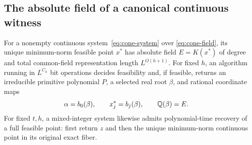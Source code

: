\subsection{The absolute field of a canonical continuous witness}
\label{app:cone-witness}

\begin{theorem}
\label{thm:cone-witness}
For a nonempty continuous system~\eqref{eq:cone-system} over
\eqref{eq:cone-field}, its unique minimum-norm feasible point $x^*$
has absolute field $E=K(x^*)$ of degree and total common-field
representation length $L^{O(h+1)}$. For fixed $h$, an algorithm running
in $L^{C_h}$ bit operations decides feasibility and, if feasible, returns
an irreducible primitive polynomial $P$, a selected real root $\beta$,
and rational coordinate maps
\[
 \alpha=b_0(\beta),\qquad x_j^*=b_j(\beta),\qquad\mathbb Q(\beta)=E.
\]
For fixed $t,h$, a mixed-integer system likewise admits polynomial-time
recovery of a full feasible point: first return $z$ and then the unique
minimum-norm continuous point in its original exact fiber.
\end{theorem}

